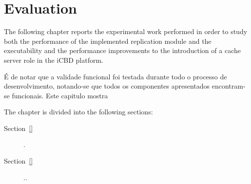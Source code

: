 \chapter{Evaluation}
\label{cha:evaluation}


The following chapter reports the experimental work performed in order to study both the performance of the implemented replication module and the executability and the performance improvements to the introduction of a cache server role in the iCBD platform.

É de notar que a validade funcional foi testada durante todo o processo de desenvolvimento, notando-se que todos os componentes apresentados encontram-se funcionais.
Este capitulo mostra 

The chapter is divided into the following sections:

\begin{description}
    \item [Section~\ref{}] .
    \item [Section~\ref{}] ..
\end{description}





